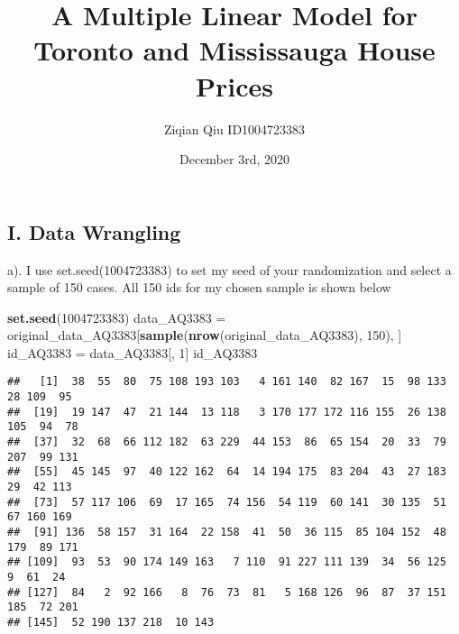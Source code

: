 \documentclass[
]{article}
\title{A Multiple Linear Model for Toronto and Mississauga House Prices}
\author{Ziqian Qiu ID1004723383}
\date{December 3rd, 2020}
\newenvironment{Shaded}{\begin{snugshade}}{\end{snugshade}}
\newcommand{\DecValTok}[1]{\textcolor[rgb]{0.00,0.00,0.81}{#1}}
\newcommand{\KeywordTok}[1]{\textcolor[rgb]{0.13,0.29,0.53}{\textbf{#1}}}
\newcommand{\NormalTok}[1]{#1}
\newcommand{\OperatorTok}[1]{\textcolor[rgb]{0.81,0.36,0.00}{\textbf{#1}}}
\newcommand{\StringTok}[1]{\textcolor[rgb]{0.31,0.60,0.02}{#1}}
\begin{document}
\maketitle

\hypertarget{i.-data-wrangling}{%
\subsection{I. Data Wrangling}\label{i.-data-wrangling}}

a). I use set.seed(1004723383) to set my seed of your randomization and
select a sample of 150 cases. All 150 ids for my chosen sample is shown
below

\begin{Shaded}
\begin{Highlighting}[]
\KeywordTok{set.seed}\NormalTok{(}\DecValTok{1004723383}\NormalTok{)}
\NormalTok{data_AQ3383 =}\StringTok{ }\NormalTok{original_data_AQ3383[}\KeywordTok{sample}\NormalTok{(}\KeywordTok{nrow}\NormalTok{(original_data_AQ3383), }\DecValTok{150}\NormalTok{), ]}
\NormalTok{id_AQ3383 =}\StringTok{ }\NormalTok{data_AQ3383[, }\DecValTok{1}\NormalTok{]}
\NormalTok{id_AQ3383}
\end{Highlighting}
\end{Shaded}

\begin{verbatim}
##   [1]  38  55  80  75 108 193 103   4 161 140  82 167  15  98 133  28 109  95
##  [19]  19 147  47  21 144  13 118   3 170 177 172 116 155  26 138 105  94  78
##  [37]  32  68  66 112 182  63 229  44 153  86  65 154  20  33  79 207  99 131
##  [55]  45 145  97  40 122 162  64  14 194 175  83 204  43  27 183  29  42 113
##  [73]  57 117 106  69  17 165  74 156  54 119  60 141  30 135  51  67 160 169
##  [91] 136  58 157  31 164  22 158  41  50  36 115  85 104 152  48 179  89 171
## [109]  93  53  90 174 149 163   7 110  91 227 111 139  34  56 125   9  61  24
## [127]  84   2  92 166   8  76  73  81   5 168 126  96  87  37 151 185  72 201
## [145]  52 190 137 218  10 143
\end{verbatim}

\begin{Shaded}
\end{Shaded}
\end{document}
